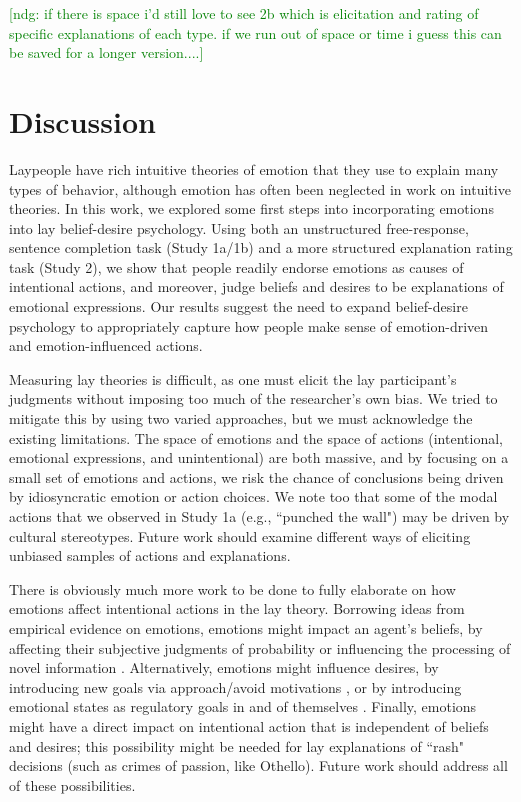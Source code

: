 \documentclass[10pt,letterpaper]{article}
\newcommand{\ndg}[1]{\textcolor{Green}{[ndg: #1]}}
\begin{document}
\ndg{if there is space i'd still love to see 2b which is elicitation and rating of specific explanations of each type. if we run out of space or time i guess this can be saved for a longer version....}



\section{Discussion}

Laypeople have rich intuitive theories of emotion that they use to explain many types of behavior, although emotion has often been neglected in work on intuitive theories. In this work, we explored some first steps into incorporating emotions into lay belief-desire psychology. Using both an unstructured free-response, sentence completion task (Study 1a/1b) and a more structured explanation rating task (Study 2), we show that people readily endorse emotions as causes of intentional actions, and moreover, judge beliefs and desires to be explanations of emotional expressions. Our results suggest the need to expand belief-desire psychology to appropriately capture how people make sense of emotion-driven and emotion-influenced actions.

Measuring lay theories is difficult, as one must elicit the lay participant's judgments without imposing too much of the researcher's own bias. We tried to mitigate this by using two varied approaches, but we must acknowledge the existing limitations. The space of emotions and the space of actions (intentional, emotional expressions, and unintentional) are both massive, and by focusing on a small set of emotions and actions, we risk the chance of conclusions being driven by idiosyncratic emotion or action choices. We note too that some of the modal actions that we observed in Study 1a (e.g., ``punched the wall") may be driven by cultural stereotypes. Future work should examine different ways of eliciting unbiased samples of actions and explanations.

There is obviously much more work to be done to fully elaborate on how emotions affect intentional actions in the lay theory. Borrowing ideas from empirical evidence on emotions, emotions might impact an agent's beliefs, by affecting their subjective judgments of probability \cite{Wright1992} or influencing the processing of novel information \cite{Forgas1995}. Alternatively, emotions might influence desires, by introducing new goals via approach/avoid motivations \cite{Carver2004}, or by introducing emotional states as regulatory goals in and of themselves \cite{Gross2006}. Finally, emotions might have a direct impact on intentional action that is independent of beliefs and desires; this possibility might be needed for lay explanations of ``rash" decisions (such as crimes of passion, like Othello). Future work should address all of these possibilities.
\end{document}
